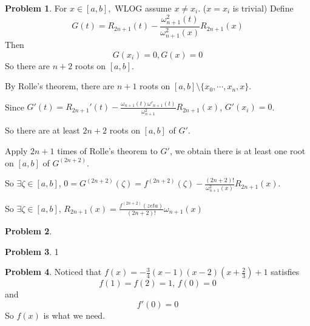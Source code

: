 \documentclass[a4paper]{article}
\theoremstyle{definition}
\newtheorem{problem}{Problem}
\theoremstyle{plain}
\newcommand{\dps}{\displaystyle}
\numberwithin{equation}{problem}
\begin{document}
\begin{problem}
    For  $ x\in [a,b], $ WLOG assume  $ x\neq x_i $. ($ x=x_i $ is trivial)
    Define 
    \[G(t)=R_{2n+1}(t)-\frac{\omega_{n+1}^2(t)}{\omega^2_{n+1}(x)}R_{2n+1}(x)\]
    Then 
    \[G(x_i)=0,G(x)=0\]
    So there are   $ n+2 $ roots on  $ [a,b] $.
    
    By Rolle's theorem, there are  $ n+1 $ roots on  $ [a,b]\setminus\{x_0,\cdots,x_n,x\} $.
    
    Since  $ G'(t)=R_{2n+1}'(t)-\frac{\omega_{n+1}(t)\omega'_{n+1}(t)}{\omega^2_{n+1}}R_{2n+1}(x) $,  $ G'(x_i)=0 $.
    
    So there are at least $ 2n+2 $ roots on $ [a,b] $ of  $ G' $.
    
    Apply  $ 2n+1 $ times of Rolle's theorem to  $ G' $, we obtain there is at least one root on  $ [a,b] $  of  $ G^{(2n+2)} $.

    So  $ \exists \zeta\in [a,b] $,  $ 0=G^{(2n+2)}(\zeta)=f^{(2n+2)}(\zeta)-\frac{(2n+2)!}{\omega_{n+1}^2(x)}R_{2n+1}(x) $.
    
    So  $ \exists \zeta\in [a,b] $,   $ R_{2n+1}(x)=\dps\frac{f^{(2n+2)}(zeta)}{(2n+2)!}\omega_{n+1}(x) $ 
\end{problem}

\begin{problem}
    
\end{problem}
\begin{problem}
    1
\end{problem}

\begin{problem}
    Noticed that  $ f(x)=-\frac{3}{4}(x-1)(x-2)(x+\frac{2}{3})+1 $ satisfies 
    \[f(1)=f(2)=1,\,f(0)=0\]
    and  
    \[f'(0)=0\]
    So  $ f(x) $ is what we need.
\end{problem}
\end{document}
